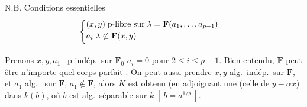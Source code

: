 \documentclass[11pt,a4paper]{article}
\begin{document}
N.B. Conditions essentielles
\[
  \begin{cases}
    (x,y) \;\text{p-libre sur}\; \lambda = \mathbf{F}(a_1, \dots, a_{p-1}) \\
    \struck{a_i}\; \lambda \not\subset \mathbf{F}(x,y)
  \end{cases}
\]
 

Prenons $x, y, a_1$ \ p-indép.\ sur $\mathbf{F}_0$
 $a_i = 0$ pour $2 \leq i \leq p-1$.
Bien entendu, $\mathbf{F}$ peut être n'importe quel corps parfait
\ill{} \ill{}. On peut aussi prendre $x, y$ alg.\ indép.\ sur $\mathbf{F}$,
et $a_1$ alg.\  sur $\mathbf{F}$, $a_1 \notin \mathbf{F}$,
alors $K$ est obtenu  (en adjoignant une \ill{}
\ill{} (celle de $y - \alpha x$) dans $k(b)$, où $b$ est alg.\ séparable sur
$k$ \quad $[\,b = a^{1/p}\,]$.
\end{document}
